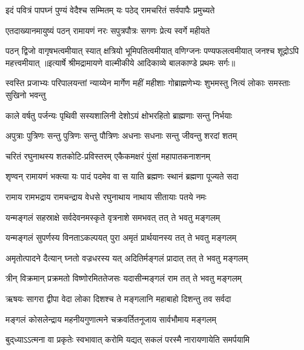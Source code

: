 \twolineshloka
{इदं पवित्रं पापघ्नं पुण्यं वेदैश्च सम्मितम्}
{यः पठेद् रामचरितं सर्वपापैः प्रमुच्यते}%

\twolineshloka
{एतदाख्यानमायुष्यं पठन् रामायणं नरः}
{सपुत्रपौत्रः सगणः प्रेत्य स्वर्गे महीयते}%

\fourlineindentedshloka
{पठन् द्विजो वागृषभत्वमीयात्}
{स्यात् क्षत्रियो भूमिपतित्वमीयात्}
{वणिग्जनः पण्यफलत्वमीयात्}
{जनश्च शूद्रोऽपि महत्त्वमीयात्}%
{॥इत्यार्षे श्रीमद्रामायणे वाल्मीकीये आदिकाव्ये बालकाण्डे प्रथमः सर्गः॥}

\medskip
\resetShloka
{}
\fourlineindentedshloka
{स्वस्ति प्रजाभ्यः परिपालयन्तां}
{न्याय्येन मार्गेण महीं महीशाः}
{गोब्राह्मणेभ्यः शुभमस्तु नित्यं}
{लोकाः समस्ताः सुखिनो भवन्तु}

\twolineshloka
{काले वर्षतु पर्जन्यः पृथिवी सस्यशालिनी}
{देशोऽयं क्षोभरहितो ब्राह्मणाः सन्तु निर्भयाः}

\twolineshloka
{अपुत्राः पुत्रिणः सन्तु पुत्रिणः सन्तु पौत्रिणः}
{अधनाः सधनाः सन्तु जीवन्तु शरदां शतम्}

\twolineshloka
{चरितं रघुनाथस्य शतकोटि-प्रविस्तरम्}
{एकैकमक्षरं पुंसां महापातकनाशनम्}

\twolineshloka
{शृण्वन् रामायणं भक्त्या यः पादं पदमेव वा}
{स याति ब्रह्मणः स्थानं ब्रह्मणा पूज्यते सदा}

\twolineshloka
{रामाय रामभद्राय रामचन्द्राय वेधसे}
{रघुनाथाय नाथाय सीतायाः पतये नमः}

\twolineshloka
{यन्मङ्गलं सहस्राक्षे सर्वदेवनमस्कृते}
{वृत्रनाशे समभवत् तत् ते भवतु मङ्गलम्}

\twolineshloka
{यन्मङ्गलं सुपर्णस्य विनताऽकल्पयत् पुरा}
{अमृतं प्रार्थयानस्य तत् ते भवतु मङ्गलम्}

\twolineshloka
{अमृतोत्पादने दैत्यान् घ्नतो वज्रधरस्य यत्}
{अदितिर्मङ्गलं प्रादात् तत् ते भवतु मङ्गलम्}

\twolineshloka
{त्रीन् विक्रमान् प्रक्रमतो विष्णोरमिततेजसः}
{यदासीन्मङ्गलं राम तत् ते भवतु मङ्गलम्}

\twolineshloka
{ऋषयः सागरा द्वीपा वेदा लोका दिशश्च ते}
{मङ्गलानि महाबाहो दिशन्तु तव सर्वदा}

\twolineshloka
{मङ्गलं कोसलेन्द्राय महनीयगुणात्मने}
{चक्रवर्तितनूजाय सार्वभौमाय मङ्गलम्}

{बुद्‌ध्याऽऽत्मना वा प्रकृतेः स्वभावात्}
{करोमि यद्यत् सकलं परस्मै}
{नारायणायेति समर्पयामि}\nopagebreak[4]
